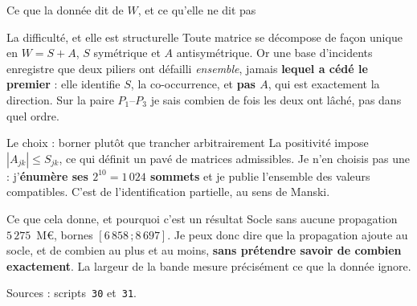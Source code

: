 \documentclass[11pt]{beamer}
\begin{document}
%

\begin{frame}{Ce que la donnée dit de \texorpdfstring{$W$}{W}, et ce qu'elle ne dit pas}
\scriptsize
\begin{block}{La difficulté, et elle est structurelle}
Toute matrice se décompose de façon unique en $W = S + A$, $S$ symétrique et $A$ antisymétrique.
Or une base d'incidents enregistre que deux piliers ont défailli \emph{ensemble}, jamais
\textbf{lequel a cédé le premier} : elle identifie $S$, la co-occurrence, et \textbf{pas $A$},
qui est exactement la direction. Sur la paire $P_1$--$P_3$ je sais combien de fois les deux ont
lâché, pas dans quel ordre.
\end{block}
\vspace{-1mm}
\begin{block}{Le choix : borner plutôt que trancher arbitrairement}
La positivité impose $|A_{jk}| \leq S_{jk}$, ce qui définit un pavé de matrices admissibles. Je
n'en choisis pas une : j'\textbf{énumère ses $2^{10} = 1\,024$ sommets} et je publie l'ensemble
des valeurs compatibles. C'est de l'identification partielle, au sens de Manski.
\end{block}
\vspace{-1mm}
\begin{block}{Ce que cela donne, et pourquoi c'est un résultat}
Socle sans aucune propagation $5\,275$~M\euro, bornes $[6\,858\,;8\,697]$. Je peux donc dire que
la propagation ajoute au socle, et de combien au plus et au moins, \textbf{sans prétendre savoir
de combien exactement}. La largeur de la bande mesure précisément ce que la donnée ignore.
\end{block}
\vspace{-1mm}
{\scriptsize Sources : scripts~\texttt{30} et~\texttt{31}.}
\end{frame}
\end{document}
